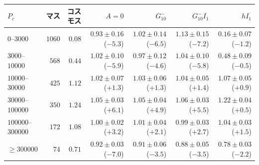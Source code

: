 \begin{tabular}{lrrrrrr}
\toprule
$P_c$ & マス & コスモス & $A = 0$ & $G_{10}^{-}$ & $G_{10}^{-}I_{1}$ & $hI_{1}$ \\
\midrule
$0$--$3000$ & $1060$ & $0.08$ & $0.93 \pm 0.16$ ($-5.3$) & $1.02 \pm 0.14$ ($-6.5$) & $1.13 \pm 0.15$ ($-7.2$) & $0.16 \pm 0.07$ ($-1.2$) \\
$3000$--$10000$ & $568$ & $0.44$ & $1.02 \pm 0.10$ ($-5.9$) & $0.97 \pm 0.12$ ($-4.6$) & $1.04 \pm 0.10$ ($-5.8$) & $0.48 \pm 0.09$ ($-0.5$) \\
$10000$--$30000$ & $425$ & $1.12$ & $1.02 \pm 0.07$ ($+1.3$) & $1.03 \pm 0.06$ ($+1.3$) & $1.04 \pm 0.05$ ($+1.4$) & $1.07 \pm 0.05$ ($+0.9$) \\
$30000$--$100000$ & $350$ & $1.24$ & $1.05 \pm 0.03$ ($+6.1$) & $1.05 \pm 0.04$ ($+4.9$) & $1.06 \pm 0.03$ ($+5.5$) & $1.22 \pm 0.04$ ($+0.5$) \\
$100000$--$300000$ & $172$ & $1.08$ & $1.00 \pm 0.02$ ($+3.2$) & $1.01 \pm 0.04$ ($+2.1$) & $0.99 \pm 0.03$ ($+2.7$) & $1.04 \pm 0.03$ ($+1.5$) \\
$\ge 300000$ & $74$ & $0.71$ & $0.92 \pm 0.03$ ($-7.0$) & $0.91 \pm 0.06$ ($-3.5$) & $0.88 \pm 0.05$ ($-3.5$) & $0.78 \pm 0.03$ ($-2.2$) \\
\bottomrule
\end{tabular}
